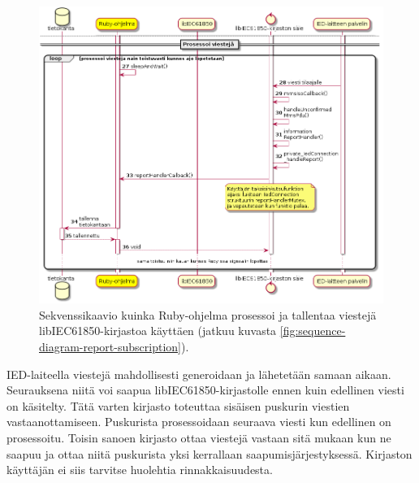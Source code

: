 \begin{figure}[ht!]
	\includegraphics[width=1\textwidth]{pictures/sequence-diagram-report-subscription_001.png}
	\caption{Sekvenssikaavio kuinka Ruby-ohjelma prosessoi ja tallentaa viestejä libIEC61850-kirjastoa käyttäen (jatkuu kuvasta \ref{fig:sequence-diagram-report-subscription}).}
	\label{fig:sequence-diagram-report-subscription-processing}
\end{figure}

IED-laiteella viestejä mahdollisesti generoidaan ja lähetetään samaan aikaan. Seurauksena niitä voi saapua libIEC61850-kirjastolle ennen kuin edellinen viesti on käsitelty. Tätä varten kirjasto toteuttaa sisäisen puskurin viestien vastaanottamiseen. Puskurista prosessoidaan seuraava viesti kun edellinen on prosessoitu. Toisin sanoen kirjasto ottaa viestejä vastaan sitä mukaan kun ne saapuu ja ottaa niitä puskurista yksi kerrallaan saapumisjärjestyksessä. Kirjaston käyttäjän ei siis tarvitse huolehtia rinnakkaisuudesta.

